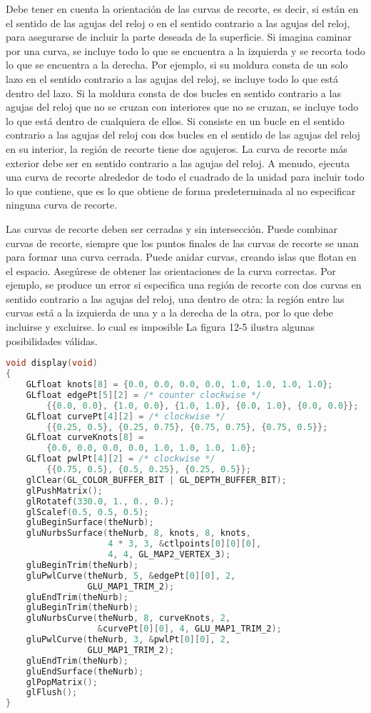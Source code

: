Debe tener en cuenta la orientación de las curvas de recorte, es decir, si están en el sentido de las agujas del reloj o en el sentido contrario a las agujas del reloj, para asegurarse de incluir la parte deseada de la superficie. Si imagina caminar por una curva, se incluye todo lo que se encuentra a la izquierda y se recorta todo lo que se encuentra a la derecha. Por ejemplo, si su moldura consta de un solo lazo en el sentido contrario a las agujas del reloj, se incluye todo lo que está dentro del lazo. Si la moldura consta de dos bucles en sentido contrario a las agujas del reloj que no se cruzan con interiores que no se cruzan, se incluye todo lo que está dentro de cualquiera de ellos. Si consiste en un bucle en el sentido contrario a las agujas del reloj con dos bucles en el sentido de las agujas del reloj en su interior, la región de recorte tiene dos agujeros. La curva de recorte más exterior debe ser en sentido contrario a las agujas del reloj. A menudo, ejecuta una curva de recorte alrededor de todo el cuadrado de la unidad para incluir todo lo que contiene, que es lo que obtiene de forma predeterminada al no especificar ninguna curva de recorte.

Las curvas de recorte deben ser cerradas y sin intersección. Puede combinar curvas de recorte, siempre que los puntos finales de las curvas de recorte se unan para formar una curva cerrada. Puede anidar curvas, creando islas que flotan en el espacio. Asegúrese de obtener las orientaciones de la curva correctas. Por ejemplo, se produce un error si especifica una región de recorte con dos curvas en sentido contrario a las agujas del reloj, una dentro de otra: la región entre las curvas está a la izquierda de una y a la derecha de la otra, por lo que debe incluirse y excluirse. lo cual es imposible La figura 12-5 ilustra algunas posibilidades válidas.

\begin{lstlisting}[language=C++]
void display(void)
{
    GLfloat knots[8] = {0.0, 0.0, 0.0, 0.0, 1.0, 1.0, 1.0, 1.0};
    GLfloat edgePt[5][2] = /* counter clockwise */
        {{0.0, 0.0}, {1.0, 0.0}, {1.0, 1.0}, {0.0, 1.0}, {0.0, 0.0}};
    GLfloat curvePt[4][2] = /* clockwise */
        {{0.25, 0.5}, {0.25, 0.75}, {0.75, 0.75}, {0.75, 0.5}};
    GLfloat curveKnots[8] =
        {0.0, 0.0, 0.0, 0.0, 1.0, 1.0, 1.0, 1.0};
    GLfloat pwlPt[4][2] = /* clockwise */
        {{0.75, 0.5}, {0.5, 0.25}, {0.25, 0.5}};
    glClear(GL_COLOR_BUFFER_BIT | GL_DEPTH_BUFFER_BIT);
    glPushMatrix();
    glRotatef(330.0, 1., 0., 0.);
    glScalef(0.5, 0.5, 0.5);
    gluBeginSurface(theNurb);
    gluNurbsSurface(theNurb, 8, knots, 8, knots,
                    4 * 3, 3, &ctlpoints[0][0][0],
                    4, 4, GL_MAP2_VERTEX_3);
    gluBeginTrim(theNurb);
    gluPwlCurve(theNurb, 5, &edgePt[0][0], 2,
                GLU_MAP1_TRIM_2);
    gluEndTrim(theNurb);
    gluBeginTrim(theNurb);
    gluNurbsCurve(theNurb, 8, curveKnots, 2,
                  &curvePt[0][0], 4, GLU_MAP1_TRIM_2);
    gluPwlCurve(theNurb, 3, &pwlPt[0][0], 2,
                GLU_MAP1_TRIM_2);
    gluEndTrim(theNurb);
    gluEndSurface(theNurb);
    glPopMatrix();
    glFlush();
}
\end{lstlisting}

